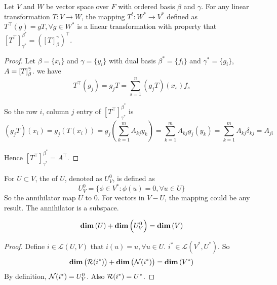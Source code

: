 \begin{theorem}
	Let $V$ and $W$ be vector space over $F$ with ordered basis $\beta$ and $\gamma$. For any linear transformation $T:V \rightarrow W$, the mapping $T^t: W^* \rightarrow V^*$ defined as $T^\top (g) = gT, \forall g \in W^*$ is a linear transformation with property that $\left[T^\top \right]_{\gamma^*}^{\beta^*} = \left(\left[T \right]_\beta^\gamma \right)^\top$.
\end{theorem}
\begin{proof}
	Let $\beta = \{x_i\}$ and $\gamma=\{y_i\}$ with dual basis $\beta^*=\{f_i\}$ and $\gamma^*=\{g_i\}$, $A=\coordinate{T}_\beta^\gamma$. we have
	\begin{equation*}
		T^\top (g_j) = g_j T = \sum_{s=1}^n (g_j T) (x_s) f_s
	\end{equation*}
	
	So the row $i$, column $j$ entry of $[T^\top]_{\gamma^*}^{\beta^*}$ is
	\begin{equation*}
	(g_j T)(x_i) = g_j (T(x_i))= g_j \left( \sum_{k=1}^m A_{kj} y_k \right) = \sum_{k=1}^m A_{kj} g_j(y_k)= \sum_{k=1}^m A_{kj} \delta_{kj} = A_{ji}
	\end{equation*}
	
	Hence $\left[T^\top \right]_{\gamma^*}^{\beta^*} = A^\top $.
\end{proof}

\begin{definition}
    For $U \subset V$, the  of $U$, denoted as $U^0_V$, is defined as
    \begin{equation*}
        U^0_V = \{ \phi \in V^*: \phi(u) = 0, \forall u \in U \}
    \end{equation*}
    So the annihilator map $U$ to $0$. For vectors in $V - U$, the mapping could be any result. The annihilator is a subspace.
\end{definition}

\begin{theorem}
    \begin{equation}
        \displaystyle \mathbf{dim}\left( U \right) + \displaystyle \mathbf{dim}\left( U_V^0 \right) = \displaystyle \mathbf{dim}\left( V \right)
    \end{equation}
\end{theorem}

\begin{proof}
    Define $i \in \mathcal{L}(U,V)$ that $i(u) = u, \forall u \in U$. $i^* \in \mathcal{L}(V^*,U^*)$. So
    \begin{equation*}
        \displaystyle \mathbf{dim}\left( \mathcal{R}(i^*)  \right) +\displaystyle \mathbf{dim}\left( \mathcal{N}(i^*) \right) = \displaystyle \mathbf{dim}\left( V^* \right)
    \end{equation*}
    By definition, $\mathcal{N}(i^*) = U^0_V$. Also $\mathcal{R}(i^*) = U^*$.
\end{proof}



